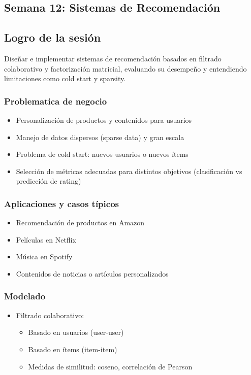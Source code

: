 \documentclass[12pt,a4paper,openany,oneside]{book}
\begin{document}
\begin{itemize}
\chapter{Semana 12: Sistemas de Recomendación}

\section{Logro de la sesión}
Diseñar e implementar sistemas de recomendación basados en filtrado colaborativo y factorización matricial, evaluando su desempeño y entendiendo limitaciones como cold start y sparsity.

\subsection{Problematica de negocio}
\begin{itemize}
    \item Personalización de productos y contenidos para usuarios
    \item Manejo de datos dispersos (sparse data) y gran escala
    \item Problema de cold start: nuevos usuarios o nuevos ítems
    \item Selección de métricas adecuadas para distintos objetivos (clasificación vs predicción de rating)
\end{itemize}

\subsection{Aplicaciones y casos típicos}
\begin{itemize}
    \item Recomendación de productos en Amazon
    \item Películas en Netflix
    \item Música en Spotify
    \item Contenidos de noticias o artículos personalizados
\end{itemize}

\subsection{Modelado}
\begin{itemize}
    \item Filtrado colaborativo:
    \begin{itemize}
        \item Basado en usuarios (user-user)
        \item Basado en ítems (item-item)
        \item Medidas de similitud: coseno, correlación de Pearson
    \end{itemize}
    

\end{itemize}
\end{itemize}
\end{document}
